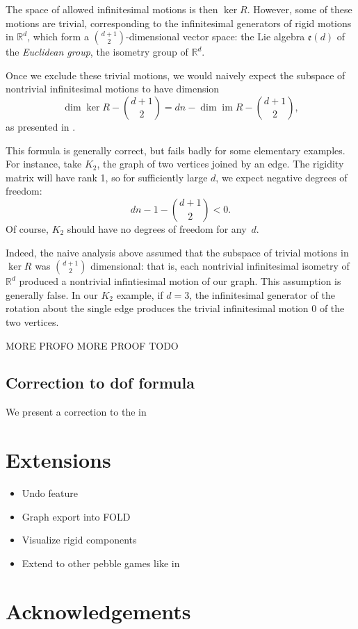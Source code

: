 \documentclass[aps,final,twocolumn,letterpaper,nofootinbib]{revtex4-1}
\newcommand\RR{\mathbb{R}}
\DeclareMathOperator\im{im}
\begin{document}
The space of allowed infinitesimal motions is then $\ker R$.
However, some of these motions are trivial,
corresponding to the infinitesimal generators of rigid motions in $\RR^d$,
which form a $\binom{d+1}{2}$-dimensional vector space:
the Lie algebra $\mathfrak e(d)$ of the \emph{Euclidean group},
the isometry group of $\RR^d$.

Once we exclude these trivial motions,
we would naively expect the subspace of nontrivial infinitesimal motions
to have dimension
\begin{equation}
    \dim\ker R - \binom{d+1}{2} = dn - \dim\im R - \binom{d+1}{2},
\end{equation}
as presented in \cite{gfalop}.

This formula is generally correct,
but fails badly for some elementary examples.
For instance, take $K_2$, the graph of two vertices joined by an edge.
The rigidity matrix will have rank 1,
so for sufficiently large $d$,
we expect negative degrees of freedom:
\[
    dn - 1 - \binom{d+1}{2} < 0.
\]
Of course, $K_2$ should have no degrees of freedom for any~$d$.

Indeed, the naive analysis above
assumed that the subspace of trivial motions in $\ker R$
was $\binom{d+1}{2}$ dimensional:
that is, each nontrivial infinitesimal isometry of $\RR^d$
produced a nontrivial infintiesimal motion of our graph.
This assumption is generally false.
In our $K_2$ example,
if $d=3$, 
the infinitesimal generator
of the rotation about the single edge
produces the trivial infinitesimal motion 0
of the two vertices.


MORE PROFO MORE PROOF TODO 

\subsection{Correction to dof formula}

We present a correction to the  in \cite{gfalop}





\section{Extensions}

\begin{itemize}
    \item
    Undo feature
    \item
    Graph export into FOLD
    \item
    Visualize rigid components
    \item
    Extend to other pebble games like in \cite{lee08, chubynsky07}
\end{itemize}


\section*{Acknowledgements}


{}

\end{document}
